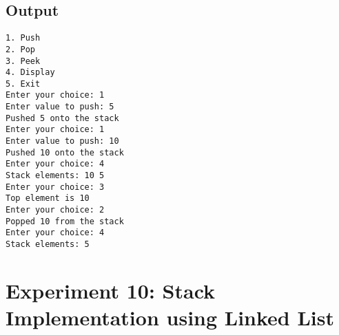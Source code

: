 \documentclass[12pt,a4paper]{article}
\begin{document}
\subsection*{Output}
\begin{tcolorbox}[terminalstyle, title=Sample Output]
\texttt{1. Push\\2. Pop\\3. Peek\\4. Display\\5. Exit\\
Enter your choice: 1\\
Enter value to push: 5\\
Pushed 5 onto the stack\\
Enter your choice: 1\\
Enter value to push: 10\\
Pushed 10 onto the stack\\
Enter your choice: 4\\
Stack elements: 10 5 \\
Enter your choice: 3\\
Top element is 10\\
Enter your choice: 2\\
Popped 10 from the stack\\
Enter your choice: 4\\
Stack elements: 5}
\end{tcolorbox}

\newpage
\section*{Experiment 10: Stack Implementation using Linked List}
\end{document}
